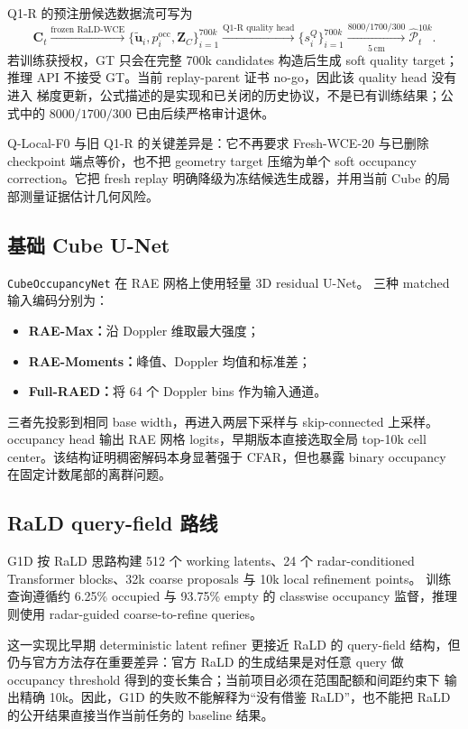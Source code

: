 \documentclass[11pt,a4paper,fontset=none]{ctexart}
\newcommand{\code}[1]{\texttt{#1}}
\begin{document}
Q1-R 的预注册候选数据流可写为
\begin{equation}
\mathbf C_t
\xrightarrow{\text{frozen RaLD-WCE}}
\{\widetilde{\mathbf u}_i,p_i^{\mathrm{occ}},\mathbf Z_C\}_{i=1}^{700k}
\xrightarrow{\text{Q1-R quality head}}
\{s_i^Q\}_{i=1}^{700k}
\xrightarrow[5\,\mathrm{cm}]{8000/1700/300}
\widehat{\mathcal P}_t^{10k}.
\end{equation}
若训练获授权，GT 只会在完整 700k candidates 构造后生成 soft quality target；
推理 API 不接受 GT。当前 replay-parent 证书 no-go，因此该 quality head 没有进入
梯度更新，公式描述的是实现和已关闭的历史协议，不是已有训练结果；公式中的
$8000/1700/300$ 已由后续严格审计退休。

Q-Local-F0 与旧 Q1-R 的关键差异是：它不再要求 Fresh-WCE-20 与已删除 checkpoint
端点等价，也不把 geometry target 压缩为单个 soft occupancy correction。它把
fresh replay 明确降级为冻结候选生成器，并用当前 Cube 的局部测量证据估计几何风险。

\subsection{基础 Cube U-Net}

\code{CubeOccupancyNet} 在 RAE 网格上使用轻量 3D residual U-Net。
三种 matched 输入编码分别为：
\begin{itemize}
  \item \textbf{RAE-Max：}沿 Doppler 维取最大强度；
  \item \textbf{RAE-Moments：}峰值、Doppler 均值和标准差；
  \item \textbf{Full-RAED：}将 64 个 Doppler bins 作为输入通道。
\end{itemize}
三者先投影到相同 base width，再进入两层下采样与 skip-connected 上采样。
occupancy head 输出 RAE 网格 logits，早期版本直接选取全局 top-10k cell
center。该结构证明稠密解码本身显著强于 CFAR，但也暴露 binary occupancy
在固定计数尾部的离群问题。

\subsection{RaLD query-field 路线}

G1D 按 RaLD 思路构建 512 个 working latents、24 个 radar-conditioned
Transformer blocks、32k coarse proposals 与 10k local refinement points。
训练查询遵循约 6.25\% occupied 与 93.75\% empty 的 classwise occupancy
监督，推理则使用 radar-guided coarse-to-refine queries。

这一实现比早期 deterministic latent refiner 更接近 RaLD 的 query-field
结构，但仍与官方方法存在重要差异：官方 RaLD 的生成结果是对任意 query
做 occupancy threshold 得到的变长集合；当前项目必须在范围配额和间距约束下
输出精确 10k。因此，G1D 的失败不能解释为“没有借鉴 RaLD”，也不能把
RaLD 的公开结果直接当作当前任务的 baseline 结果。
\end{document}
